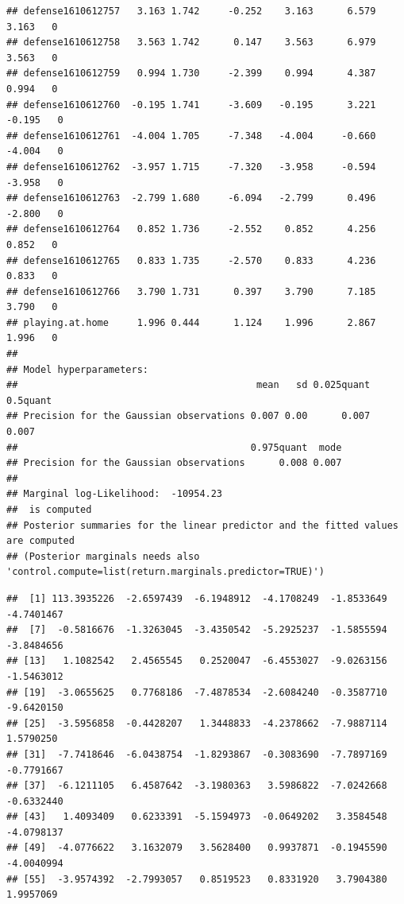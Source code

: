 \documentclass[
]{article}
\newenvironment{Shaded}{\begin{snugshade}}{\end{snugshade}}
\newcommand{\DocumentationTok}[1]{\textcolor[rgb]{0.56,0.35,0.01}{\textbf{\textit{#1}}}}
\newcommand{\NormalTok}[1]{#1}
\newcommand{\SpecialCharTok}[1]{\textcolor[rgb]{0.00,0.00,0.00}{#1}}
\newcommand{\StringTok}[1]{\textcolor[rgb]{0.31,0.60,0.02}{#1}}
\begin{document}
\begin{verbatim}
## defense1610612757   3.163 1.742     -0.252    3.163      6.579   3.163   0
## defense1610612758   3.563 1.742      0.147    3.563      6.979   3.563   0
## defense1610612759   0.994 1.730     -2.399    0.994      4.387   0.994   0
## defense1610612760  -0.195 1.741     -3.609   -0.195      3.221  -0.195   0
## defense1610612761  -4.004 1.705     -7.348   -4.004     -0.660  -4.004   0
## defense1610612762  -3.957 1.715     -7.320   -3.958     -0.594  -3.958   0
## defense1610612763  -2.799 1.680     -6.094   -2.799      0.496  -2.800   0
## defense1610612764   0.852 1.736     -2.552    0.852      4.256   0.852   0
## defense1610612765   0.833 1.735     -2.570    0.833      4.236   0.833   0
## defense1610612766   3.790 1.731      0.397    3.790      7.185   3.790   0
## playing.at.home     1.996 0.444      1.124    1.996      2.867   1.996   0
## 
## Model hyperparameters:
##                                          mean   sd 0.025quant 0.5quant
## Precision for the Gaussian observations 0.007 0.00      0.007    0.007
##                                         0.975quant  mode
## Precision for the Gaussian observations      0.008 0.007
## 
## Marginal log-Likelihood:  -10954.23 
##  is computed 
## Posterior summaries for the linear predictor and the fitted values are computed
## (Posterior marginals needs also 'control.compute=list(return.marginals.predictor=TRUE)')
\end{verbatim}

\begin{Shaded}
\end{Shaded}

\begin{verbatim}
##  [1] 113.3935226  -2.6597439  -6.1948912  -4.1708249  -1.8533649  -4.7401467
##  [7]  -0.5816676  -1.3263045  -3.4350542  -5.2925237  -1.5855594  -3.8484656
## [13]   1.1082542   2.4565545   0.2520047  -6.4553027  -9.0263156  -1.5463012
## [19]  -3.0655625   0.7768186  -7.4878534  -2.6084240  -0.3587710  -9.6420150
## [25]  -3.5956858  -0.4428207   1.3448833  -4.2378662  -7.9887114   1.5790250
## [31]  -7.7418646  -6.0438754  -1.8293867  -0.3083690  -7.7897169  -0.7791667
## [37]  -6.1211105   6.4587642  -3.1980363   3.5986822  -7.0242668  -0.6332440
## [43]   1.4093409   0.6233391  -5.1594973  -0.0649202   3.3584548  -4.0798137
## [49]  -4.0776622   3.1632079   3.5628400   0.9937871  -0.1945590  -4.0040994
## [55]  -3.9574392  -2.7993057   0.8519523   0.8331920   3.7904380   1.9957069
\end{verbatim}
\end{document}
